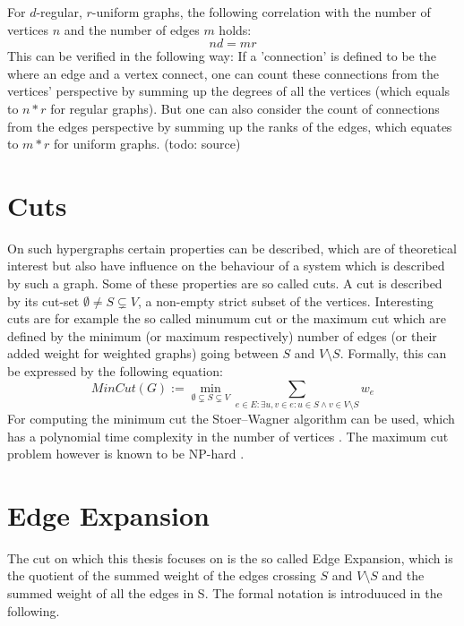 For $d$-regular, $r$-uniform graphs, the following correlation with the number of vertices $n$ and the number of edges $m$ holds:
\begin{equation}\label{eq:ndmr}
	 n d = m r
\end{equation}
 This can be verified in the following way: If a 'connection' is defined to be the where an edge and a vertex connect, one can count these connections from the vertices' perspective by summing up the degrees of all the vertices (which equals to $n*r$ for regular graphs). But one can also consider the count of connections from the edges perspective by summing up the ranks of the edges, which equates to $m*r$ for uniform graphs. (todo: source)

\section{Cuts}
On such hypergraphs certain properties can be described, which are of theoretical interest but also have influence on the behaviour of a system which is described by such a graph. Some of these properties are so called cuts. A cut is described by its cut-set $\emptyset \neq S \subsetneq V$, a non-empty strict subset of the vertices. Interesting cuts are for example the so called minumum cut or the maximum cut which are defined by the minimum (or maximum respectively) number of edges (or their added weight for weighted graphs) going between $S$ and $V \setminus S$. Formally, this can be expressed by the following equation: \begin{equation}
MinCut(G) := \min_{\emptyset \subsetneq S \subsetneq V} \sum_{e\in E:\exists u, v \in e: u \in S \land v \in V \setminus S } w_e
\end{equation}
For computing the minimum cut the Stoer–Wagner algorithm can be used, which has a polynomial time complexity in the number of vertices \cite{stoer1997simple}.
The maximum cut problem however is known to be NP-hard \cite{karp1972reducibility}.

\section{Edge Expansion}
The cut on which this thesis focuses on is the so called Edge Expansion, which is the quotient of the summed weight of the edges crossing $S$ and $V\setminus S$ and the summed weight of all the edges in S. The formal notation is introduuced in the following.

